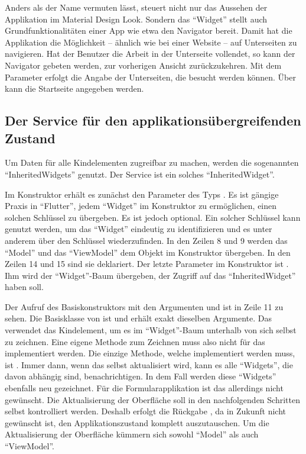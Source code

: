 Anders als der Name vermuten lässt, steuert  nicht nur das Aussehen der Applikation im Material Design Look.
Sondern das \enquote{Widget} stellt auch Grundfunktionalitäten einer App wie etwa den Navigator bereit.
Damit hat die Applikation die Möglichkeit -- ähnlich wie bei einer Website -- auf Unterseiten zu navigieren.
Hat der Benutzer die Arbeit in der Unterseite vollendet, so kann der Navigator gebeten werden, zur vorherigen Ansicht zurückzukehren.
 Mit dem Parameter   erfolgt die Angabe der Unterseiten, die besucht werden können.
Über   kann die Startseite angegeben werden.


\subsection{Der Service für den applikationsübergreifenden Zustand}

Um Daten für alle Kindelementen zugreifbar zu machen, werden die sogenannten \enquote{InheritedWidgets} genutzt.
Der Service  \Lst{\ref{lst:Schritt1DerServiceAppState}} ist ein solches \enquote{InheritedWidget}.

Im Konstruktor erhält es zunächst den Parameter des Typs  .
Es ist gängige Praxis in \enquote{Flutter}, jedem \enquote{Widget} im Konstruktor zu ermöglichen, einen solchen Schlüssel zu übergeben.
Es ist jedoch optional.
 Ein solcher Schlüssel kann genutzt werden, um das \enquote{Widget} eindeutig zu identifizieren und es unter anderem über den Schlüssel wiederzufinden.
In den Zeilen 8 und 9 werden das \enquote{Model} und das \enquote{ViewModel} dem Objekt im Konstruktor übergeben.
In den Zeilen 14 und 15 sind sie deklariert.
Der letzte Parameter im Konstruktor ist .
Ihm wird der \enquote{Widget}-Baum übergeben, der Zugriff auf das \enquote{InheritedWidget} haben soll.

Der Aufruf des Basiskonstruktors mit den Argumenten  und  ist in Zeile 11 zu sehen.
Die Basisklasse von  ist  und erhält exakt dieselben Argumente.
 Das  verwendet das Kindelement, um es im \enquote{Widget}-Baum unterhalb von sich selbst zu zeichnen.
 Eine eigene Methode zum Zeichnen muss also nicht für das  implementiert werden.
Die einzige Methode, welche implementiert werden muss, ist  .
Immer dann, wenn das  selbst aktualisiert wird, kann es alle \enquote{Widgets}, die davon abhängig sind, benachrichtigen.
 In dem Fall werden diese  \enquote{Widgets} ebenfalls neu gezeichnet.
Für die Formularapplikation ist das allerdings nicht gewünscht.
Die Aktualisierung der Oberfläche soll in den nachfolgenden Schritten selbst kontrolliert werden.
Deshalb erfolgt die Rückgabe , da in Zukunft nicht gewünscht ist, den Applikationszustand komplett auszutauschen.
 Um die  Aktualisierung  der Oberfläche  kümmern sich sowohl \enquote{Model} als auch \enquote{ViewModel}.

